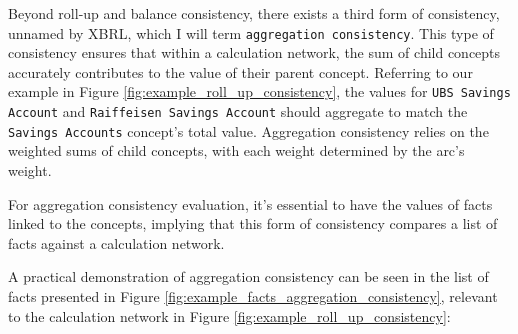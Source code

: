 Beyond roll-up and balance consistency, there exists a third form of consistency, unnamed by XBRL, which I will term \texttt{aggregation consistency}.  
This type of consistency ensures that within a calculation network, the sum of child concepts accurately contributes to the value of their parent concept.  
Referring to our example in Figure \ref{fig:example_roll_up_consistency},  
the values for \texttt{UBS Savings Account} and \texttt{Raiffeisen Savings Account} should aggregate to match the \texttt{Savings Accounts} concept's total value.  
Aggregation consistency relies on the weighted sums of child concepts, with each weight determined by the arc's weight.

For aggregation consistency evaluation, it's essential to have the values of facts linked to the concepts,  
implying that this form of consistency compares a list of facts against a calculation network.

A practical demonstration of aggregation consistency can be seen in the list of facts presented in Figure \ref{fig:example_facts_aggregation_consistency}, 
relevant to the calculation network in Figure \ref{fig:example_roll_up_consistency}:


